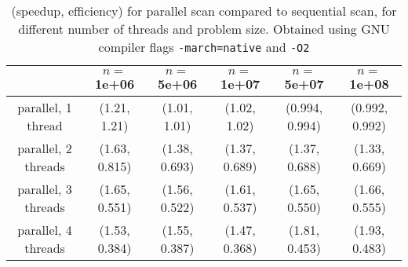 \documentclass[10pt]{article}
\begin{document}
\begin{enumerate}
\begin{table}[!ht]
\centering
\caption{(speedup, efficiency) for parallel scan compared to sequential scan, for different number of threads and problem size. Obtained using GNU compiler flags \texttt{-march=native} and \texttt{-O2}} \label{prob3-speedup}
\begin{tabular}{| c | c | c | c | c | c |}
\hline
& $n=$ 1e+06 & $n=$ 5e+06 & $n=$ 1e+07 & $n=$ 5e+07 & $n=$ 1e+08\\
\hline
parallel, 1 thread & (1.21, 1.21) & (1.01, 1.01) &  (1.02, 1.02) & (0.994, 0.994)  & (0.992, 0.992) \\
parallel, 2 threads & (1.63, 0.815) & (1.38, 0.693) &  (1.37, 0.689) & (1.37, 0.688)  & (1.33, 0.669)  \\
parallel, 3 threads & (1.65, 0.551) & (1.56, 0.522) & (1.61, 0.537) &  (1.65, 0.550) & (1.66, 0.555) \\
parallel, 4 threads & (1.53, 0.384) & (1.55, 0.387) &  (1.47, 0.368) & (1.81, 0.453)  &  (1.93, 0.483) \\
\hline
\end{tabular}
\end{table}



\end{enumerate}
	







    
    
\end{document}

